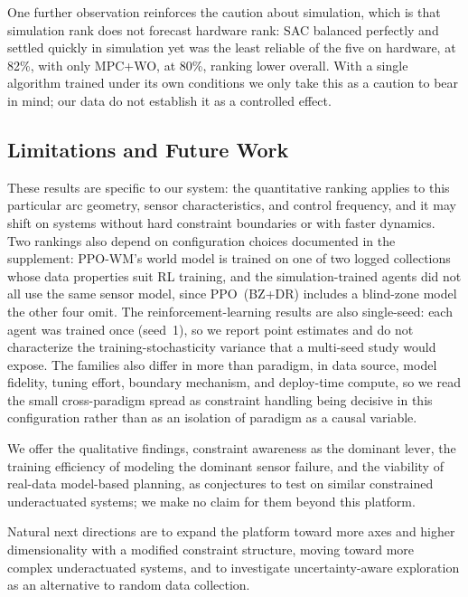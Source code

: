 One further observation reinforces the caution about simulation, which is that simulation rank does not forecast hardware rank: SAC balanced perfectly and settled quickly in simulation yet was the least reliable of the five on hardware, at 82\%, with only MPC+WO, at 80\%, ranking lower overall.
With a single algorithm trained under its own conditions we only take this as a caution to bear in mind; our data do not establish it as a controlled effect.

\subsection{Limitations and Future Work}

These results are specific to our system: the quantitative ranking applies to this particular arc geometry, sensor characteristics, and control frequency, and it may shift on systems without hard constraint boundaries or with faster dynamics.
Two rankings also depend on configuration choices documented in the supplement: PPO-WM's world model is trained on one of two logged collections whose data properties suit RL training, and the simulation-trained agents did not all use the same sensor model, since PPO~(BZ+DR) includes a blind-zone model the other four omit.
The reinforcement-learning results are also single-seed: each agent was trained once (seed~1), so we report point estimates and do not characterize the training-stochasticity variance that a multi-seed study would expose.
The families also differ in more than paradigm, in data source, model fidelity, tuning effort, boundary mechanism, and deploy-time compute, so we read the small cross-paradigm spread as constraint handling being decisive in this configuration rather than as an isolation of paradigm as a causal variable.

We offer the qualitative findings, constraint awareness as the dominant lever, the training efficiency of modeling the dominant sensor failure, and the viability of real-data model-based planning, as conjectures to test on similar constrained underactuated systems; we make no claim for them beyond this platform.

Natural next directions are to expand the platform toward more axes and higher dimensionality with a modified constraint structure, moving toward more complex underactuated systems, and to investigate uncertainty-aware exploration as an alternative to random data collection.
